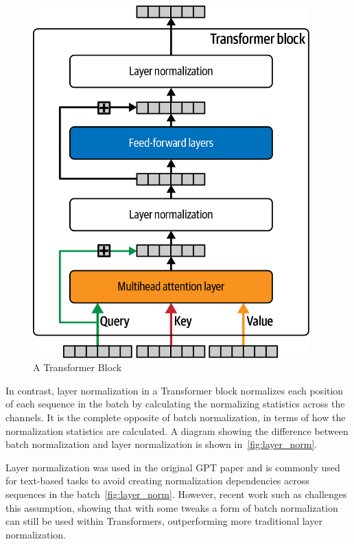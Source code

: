 \begin{figure}
	\begin{center}
		\includegraphics[width=0.95\textwidth]{figures/transformer_block}
	\end{center}
	\caption{A Transformer Block~\cite{foster2022generative}}\label{fig:transformer_block}
\end{figure}

In contrast, layer normalization in a Transformer block normalizes each position of each sequence in the batch by calculating the normalizing statistics across the channels.
It is the complete opposite of batch normalization, in terms of how the normalization statistics are calculated.
A diagram showing the difference between batch normalization and layer normalization is shown in~\autoref{fig:layer_norm}.

Layer normalization was used in the original GPT paper and is commonly used for text-based tasks to avoid creating normalization dependencies across sequences in the batch~\autoref{fig:layer_norm}.
However, recent work such as \textcite{shen2020powernorm} challenges this assumption, showing that with some tweaks a form of batch normalization can still be used within Transformers, outperforming more traditional layer normalization.


